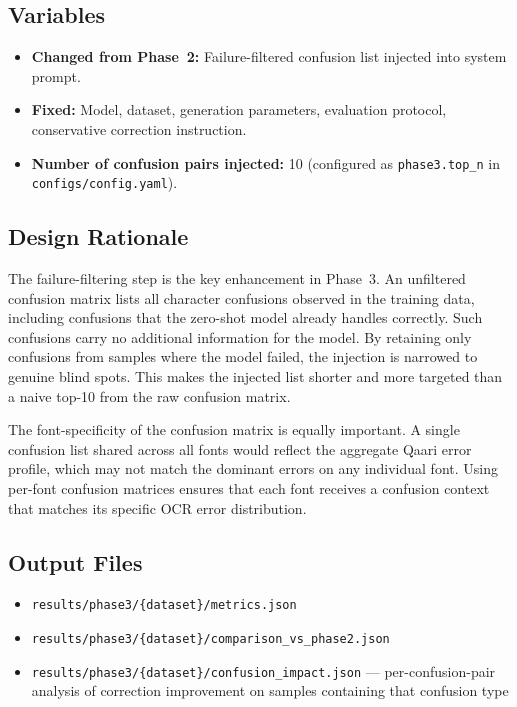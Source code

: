 \subsection{Variables}
\begin{itemize}
  \item \textbf{Changed from Phase~2:} Failure-filtered confusion list
        injected into system prompt.
  \item \textbf{Fixed:} Model, dataset, generation parameters, evaluation
        protocol, conservative correction instruction.
  \item \textbf{Number of confusion pairs injected:} 10 (configured as
        \texttt{phase3.top\_n} in \texttt{configs/config.yaml}).
\end{itemize}

\subsection{Design Rationale}
\label{subsec:phase3_rationale}

The failure-filtering step is the key enhancement in Phase~3. An unfiltered
confusion matrix lists all character confusions observed in the training data,
including confusions that the zero-shot model already handles correctly. Such
confusions carry no additional information for the model. By retaining only
confusions from samples where the model failed, the injection is narrowed to
genuine blind spots. This makes the injected list shorter and more targeted
than a naive top-10 from the raw confusion matrix.

The font-specificity of the confusion matrix is equally important. A single
confusion list shared across all fonts would reflect the aggregate Qaari error
profile, which may not match the dominant errors on any individual font. Using
per-font confusion matrices ensures that each font receives a confusion context
that matches its specific OCR error distribution.

\subsection{Output Files}
\begin{itemize}
  \item \texttt{results/phase3/\{dataset\}/metrics.json}
  \item \texttt{results/phase3/\{dataset\}/comparison\_vs\_phase2.json}
  \item \texttt{results/phase3/\{dataset\}/confusion\_impact.json} ---
        per-confusion-pair analysis of correction improvement on samples
        containing that confusion type
\end{itemize}

